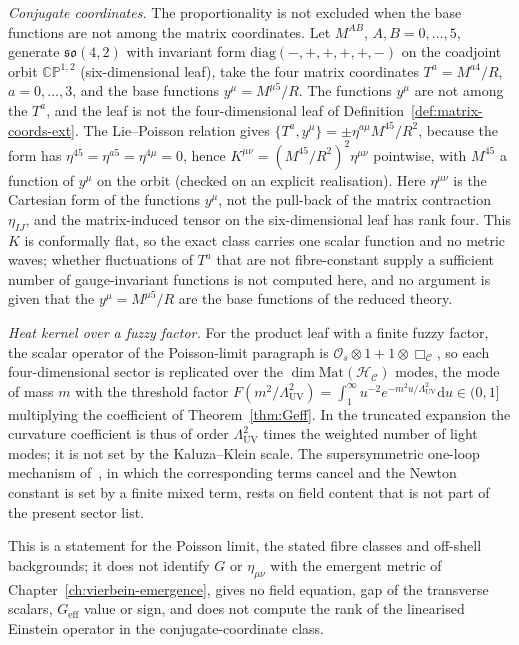 \emph{Conjugate coordinates.} The proportionality is not excluded when the base functions are not among the matrix coordinates. Let \(M^{AB}\), \(A,B=0,\dots,5\), generate \(\mathfrak{so}(4,2)\) with invariant form \(\mathrm{diag}(-,+,+,+,+,-)\) on the coadjoint orbit \(\mathbb{CP}^{1,2}\) (six-dimensional leaf), take the four matrix coordinates \(T^a=M^{a4}/R\), \(a=0,\dots,3\), and the base functions \(y^\mu=M^{\mu5}/R\). The functions \(y^\mu\) are not among the \(T^a\), and the leaf is not the four-dimensional leaf of Definition~\ref{def:matrix-coords-ext}. The Lie--Poisson relation gives \(\{T^a,y^\mu\}=\pm\eta^{a\mu}M^{45}/R^2\), because the form has \(\eta^{45}=\eta^{a5}=\eta^{4\mu}=0\), hence \(K^{\mu\nu}=(M^{45}/R^2)^2\eta^{\mu\nu}\) pointwise, with \(M^{45}\) a function of \(y^\mu\) on the orbit (checked on an explicit realisation). Here \(\eta^{\mu\nu}\) is the Cartesian form of the functions \(y^\mu\), not the pull-back of the matrix contraction \(\eta_{IJ}\), and the matrix-induced tensor on the six-dimensional leaf has rank four. This \(K\) is conformally flat, so the exact class carries one scalar function and no metric waves; whether fluctuations of \(T^a\) that are not fibre-constant supply a sufficient number of gauge-invariant functions is not computed here, and no argument is given that the \(y^\mu=M^{\mu5}/R\) are the base functions of the reduced theory.

\emph{Heat kernel over a fuzzy factor.} For the product leaf with a finite fuzzy factor, the scalar operator of the Poisson-limit paragraph is \(\mathcal O_s\otimes1+1\otimes\Box_{\mathcal C}\), so each four-dimensional sector is replicated over the \(\dim\mathrm{Mat}(\mathcal H_{\mathcal C})\) modes, the mode of mass \(m\) with the threshold factor \(F(m^2/\Lambda_{\mathrm{UV}}^2)=\int_1^\infty u^{-2}e^{-m^2u/\Lambda_{\mathrm{UV}}^2}\mathrm du\in(0,1]\) multiplying the coefficient of Theorem~\ref{thm:Geff}. In the truncated expansion the curvature coefficient is thus of order \(\Lambda_{\mathrm{UV}}^2\) times the weighted number of light modes; it is not set by the Kaluza--Klein scale. The supersymmetric one-loop mechanism of~\cite{Steinacker2023}, in which the corresponding terms cancel and the Newton constant is set by a finite mixed term, rests on field content that is not part of the present sector list.

This is a statement for the Poisson limit, the stated fibre classes and off-shell backgrounds; it does not identify \(G\) or \(\eta_{\mu\nu}\) with the emergent metric of Chapter~\ref{ch:vierbein-emergence}, gives no field equation, gap of the transverse scalars, \(G_{\mathrm{eff}}\) value or sign, and does not compute the rank of the linearised Einstein operator in the conjugate-coordinate class.

